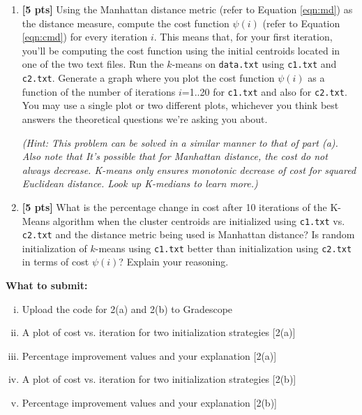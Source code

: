 \begin{enumerate}
\item \textbf{[5 pts] } 
Using the Manhattan distance metric (refer to Equation \ref{eqn:md}) as the distance measure, compute the cost function $\psi(i)$ (refer to Equation \ref{eqn:cmd}) for every iteration $i$. This means that, for your first iteration, you'll be computing the cost function using the initial centroids located in one of the two text files. Run the $k$-means on \texttt{data.txt} using \texttt{c1.txt} and \texttt{c2.txt}. Generate a graph where you plot the cost function $\psi(i)$ as a function of the number of iterations $i$=1..20 for \texttt{c1.txt} and also for \texttt{c2.txt}. You may use a single plot or two different plots, whichever you think best answers the theoretical questions we’re asking you about.

\textit{(Hint: This problem can be solved in a similar manner to that of part (a). Also note that It's possible that for Manhattan distance, the cost do not always decrease. K-means only ensures monotonic decrease of cost for squared Euclidean distance. Look up K-medians to learn more.)}

\item \textbf{[5 pts] } What is the percentage change in cost after 10 iterations of the K-Means algorithm when the cluster centroids are initialized using \texttt{c1.txt} vs. \texttt{c2.txt} and the distance metric being used is Manhattan distance? Is random initialization of
$k$-means using \texttt{c1.txt} better than initialization using \texttt{c2.txt}
in terms of cost $\psi(i)$? Explain your reasoning.

\end{enumerate}

\textbf{What to submit:}\\
\begin{enumerate}[(i)]
\item Upload the code for 2(a) and 2(b) to Gradescope
\item A plot of cost vs. iteration for two initialization strategies [2(a)]
\item Percentage improvement values and your explanation [2(a)]
\item A plot of cost vs. iteration for two initialization strategies [2(b)]
\item Percentage improvement values and your explanation [2(b)]
\end{enumerate}

